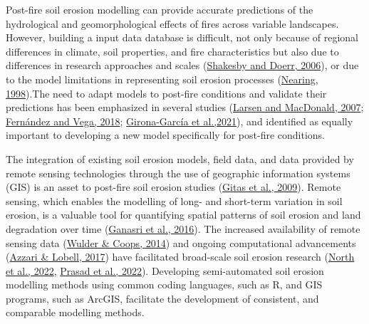 \documentclass[
]{article}
\begin{document}
Post-fire soil erosion modelling can provide accurate predictions of the hydrological and geomorphological effects of fires across variable landscapes. However, building a input data database is difficult, not only because of regional differences in climate, soil properties, and fire characteristics but also due to differences in research approaches and scales (\href{https://www.sciencedirect.com/science/article/pii/S0012825205001467}{Shakesby and Doerr, 2006}), or due to the model limitations in representing soil erosion processes (\href{https://www.researchgate.net/publication/222472796_Why_Soil_Erosion_Models_Over-Predict_Small_Soil_Losses_and_Under-Predict_Large_Soil_Losses}{Nearing, 1998}).The need to adapt models to post-fire conditions and validate their predictions has been emphasized in several studies (\href{https://acsess.onlinelibrary.wiley.com/doi/abs/10.2136/sssaj2007.0432}{Larsen and MacDonald, 2007}; \href{https://www.sciencedirect.com/science/article/pii/S0013935117317644}{Fernández and Vega, 2018}; \href{https://www.sciencedirect.com/science/article/pii/S0012825221001112}{Girona-García et al.,2021}), and identified as equally important to developing a new model specifically for post-fire conditions.

The integration of existing soil erosion models, field data, and data provided by remote sensing technologies through the use of geographic information systems (GIS) is an asset to post-fire soil erosion studies (\href{https://www.researchgate.net/publication/242519680_Multi-temporal_soil_erosion_risk_assessment_in_N_Chalkidiki_using_a_modified_USLE_raster_model}{Gitas et al., 2009}). Remote sensing, which enables the modelling of long- and short-term variation in soil erosion, is a valuable tool for quantifying spatial patterns of soil erosion and land degradation over time (\href{https://www.sciencedirect.com/science/article/pii/S1674987115001255\#!}{Ganasri et al., 2016}). The increased availability of remote sensing data (\href{https://www.nature.com/articles/513030a}{Wulder \& Coops, 2014}) and ongoing computational advancements (\href{https://www.researchgate.net/publication/312518132_Satellite_detection_of_rising_maize_yield_heterogeneity_in_the_US_Midwest}{Azzari \& Lobell, 2017}) have facilitated broad-scale soil erosion research (\href{https://www.sciencedirect.com/science/article/pii/S0301479721018740}{North et al., 2022}, \href{https://www.tandfonline.com/doi/abs/10.1080/09715010.2020.1814881}{Prasad et al., 2022}). Developing semi-automated soil erosion modelling methods using common coding languages, such as R, and GIS programs, such as ArcGIS, facilitate the development of consistent, and comparable modelling methods.
\end{document}

